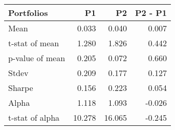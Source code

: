 \begin{tabular}{lrrr}
\toprule
Portfolios & P1 & P2 & P2 - P1 \\
\midrule
Mean & 0.033 & 0.040 & 0.007 \\
t-stat of mean & 1.280 & 1.826 & 0.442 \\
p-value of mean & 0.205 & 0.072 & 0.660 \\
Stdev & 0.209 & 0.177 & 0.127 \\
Sharpe & 0.156 & 0.223 & 0.054 \\
Alpha & 1.118 & 1.093 & -0.026 \\
t-stat of alpha & 10.278 & 16.065 & -0.245 \\
\bottomrule
\end{tabular}
